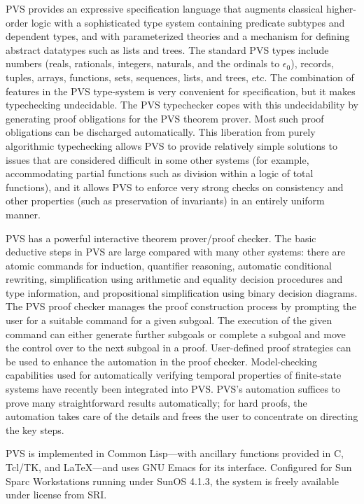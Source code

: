 \documentclass[11pt,part]{article}
\begin{document}
PVS provides an expressive specification language that augments
classical higher-order logic with a sophisticated type system
containing predicate subtypes and dependent types, and with
parameterized theories and a mechanism for defining abstract datatypes
such as lists and trees.  The standard PVS types include numbers
(reals, rationals, integers, naturals, and the ordinals to
$\epsilon_{0}$), records, tuples, arrays, functions, sets, sequences,
lists, and trees, etc.  The combination of features in the PVS
type-system is very convenient for specification, but it makes
typechecking undecidable.  The PVS typechecker copes with this
undecidability by generating proof obligations for the PVS theorem
prover.  Most such proof obligations can be discharged automatically.
This liberation from purely algorithmic typechecking allows PVS to
provide relatively simple solutions to issues that are considered
difficult in some other systems (for example, accommodating partial
functions such as division within a logic of total functions), and it
allows PVS to enforce very strong checks on consistency and other
properties (such as preservation of invariants) in an entirely uniform
manner.

PVS has a powerful interactive theorem prover/proof checker.  The
basic deductive steps in PVS are large compared with many other
systems: there are atomic commands for induction, quantifier
reasoning, automatic conditional rewriting, simplification using
arithmetic and equality decision procedures and type information, and
propositional simplification using binary decision diagrams.  The PVS
proof checker manages the proof construction process by prompting the
user for a suitable command for a given subgoal.  The execution of the
given command can either generate further subgoals or complete a
subgoal and move the control over to the next subgoal in a proof.
User-defined proof strategies can be used to enhance the automation in
the proof checker.  Model-checking capabilities used for automatically
verifying temporal properties of finite-state systems have recently
been integrated into PVS\@.  PVS's automation suffices to prove many
straightforward results automatically; for hard proofs, the automation
takes care of the details and frees the user to concentrate on
directing the key steps.

PVS is implemented in Common Lisp---with ancillary functions provided
in C, Tcl/TK, and \LaTeX---and uses GNU Emacs for its interface.
Configured for Sun {\sc Sparc} Workstations running under SunOS
4.1.3,  the system is freely available under license from SRI.
\end{document}

